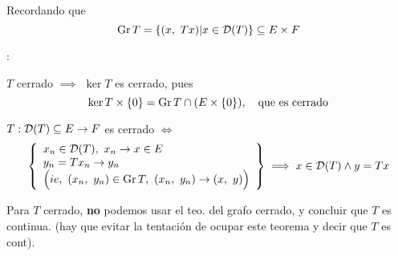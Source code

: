 Recordando que $$\operatorname{\mathop{\text{\upshape{Gr}}}} T = \{ (x, \ Tx) | x \in \mathcal{D} (T) \} \subseteq E \times F$$

\begin{note}: 
\begin{ienumerate}
    \item $T$ cerrado $\implies$ $\ker T$ es cerrado, pues $$ \ker T \times \{ 0\} = \operatorname{\mathop{\text{\upshape{Gr}}}} T \cap (E \times \{ 0\}), \quad \text{que es cerrado}$$ 
    
    \item $T: \mathcal{D}(T) \subseteq E \to F$ es cerrado $\iff$
    $$\left\{
    \begin{array}{l}
    {x_n \in \mathcal{D}(T), \ x_n \to x \in E}\\
    {y_n = T x_n \to y_n} \\
    {\Bigl(ie, \ (x_n, \ y_n) \in \operatorname{\mathop{\text{\upshape{Gr}}}} T, \ (x_n, \ y_n) \to (x, \ y) \Bigr)}
    \end{array}
    \right\} \implies x \in \mathcal{D}(T) \wedge y = T x
    $$
    
    \item Para $T$ cerrado, \textbf{no} podemos usar el teo. del grafo cerrado, y concluir que $T$ es continua. (hay que evitar la tentación de ocupar este teorema y decir que $T$ es cont).
\end{ienumerate}
\end{note}
